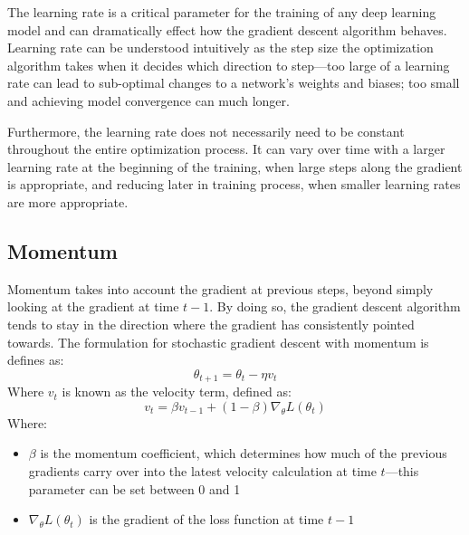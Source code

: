 \documentclass [MAS] {uclathes}
\begin{document}
The learning rate is a critical parameter for the training of any deep learning model and can dramatically effect how 
the gradient descent algorithm behaves. Learning rate can be understood intuitively as the step size the optimization 
algorithm takes when it decides which direction to step---too large of a learning rate can lead to sub-optimal changes 
to a network's weights and biases; too small and achieving model convergence can much longer.

Furthermore, the learning rate does not necessarily need to be constant throughout the entire optimization process. It 
can vary over time with a larger learning rate at the beginning of the training, when large steps along the gradient is 
appropriate, and reducing later in training process, when smaller learning rates are more appropriate.

\subsection{Momentum}
Momentum takes into account the gradient at previous steps, beyond simply looking at the gradient at time \(t-1\). By 
doing so, the gradient descent algorithm tends to stay in the direction where the gradient has consistently pointed 
towards. The formulation for stochastic gradient descent with momentum is defines as:
\[\theta_{t+1} = \theta_{t} - \eta v_{t}\]
Where \(v_{t}\) is known as the velocity term, defined as:
\[v_{t} = \beta v_{t-1} + (1 - \beta) \nabla_{\theta} L(\theta_{t})\]
Where:
\begin{itemize}
    \item \(\beta\) is the momentum coefficient, which determines how much of the previous gradients carry over into the 
    latest velocity calculation at time \(t\)---this parameter can be set between 0 and 1
    \item \(\nabla_{\theta} L(\theta_{t})\) is the gradient of the loss function at time \(t-1\)
\end{itemize}
\end{document}
